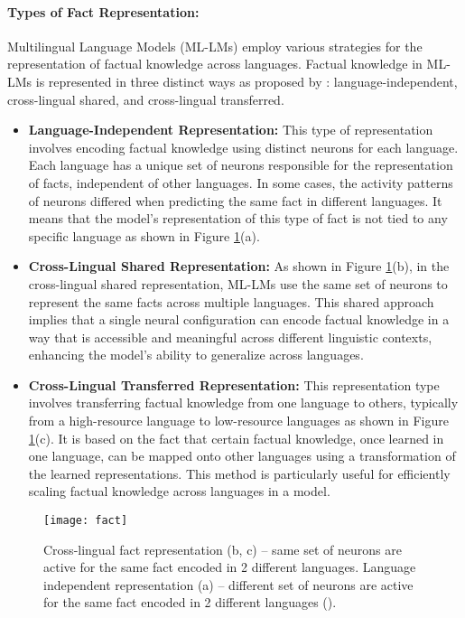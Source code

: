 \paragraph{Types of Fact Representation:} Multilingual Language Models (ML-LMs) employ various strategies for the representation of factual knowledge across languages. Factual knowledge in ML-LMs is represented in three distinct ways as proposed by \citet{zhao2024tracing}: language-independent, cross-lingual shared, and cross-lingual transferred.
\begin{itemize}
	\item \textbf{Language-Independent Representation:} This type of representation involves encoding factual knowledge using distinct neurons for each language. Each language has a unique set of neurons responsible for the representation of facts, independent of other languages. In some cases, the activity patterns of neurons differed when predicting the same fact in different languages. It means that the model's representation of this type of fact is not tied to any specific language as shown in Figure \ref{fig: fact}(a).
	
	\item \textbf{Cross-Lingual Shared Representation:} As shown in Figure \ref{fig: fact}(b), in the cross-lingual shared representation, ML-LMs use the same set of neurons to represent the same facts across multiple languages. This shared approach implies that a single neural configuration can encode factual knowledge in a way that is accessible and meaningful across different linguistic contexts, enhancing the model's ability to generalize across languages.
	
	\item \textbf{Cross-Lingual Transferred Representation:} This representation type involves transferring factual knowledge from one language to others, typically from a high-resource language to low-resource languages as shown in Figure \ref{fig: fact}(c). It is based on the fact that certain factual knowledge, once learned in one language, can be mapped onto other languages using a transformation of the learned representations. This method is particularly useful for efficiently scaling factual knowledge across languages in a model.
	
\end{itemize}

\begin{figure}[tbh]
	\centering
	\texttt{[image: fact]}
	\caption[Cross-lingual fact representation]{Cross-lingual fact representation (b, c) -- same set of neurons are active for the same fact encoded in 2 different languages. Language independent representation (a) -- different set of neurons are active for the same fact encoded in 2 different languages (\citet{zhao2024tracing}).}
	\label{fig: fact}
\end{figure}

